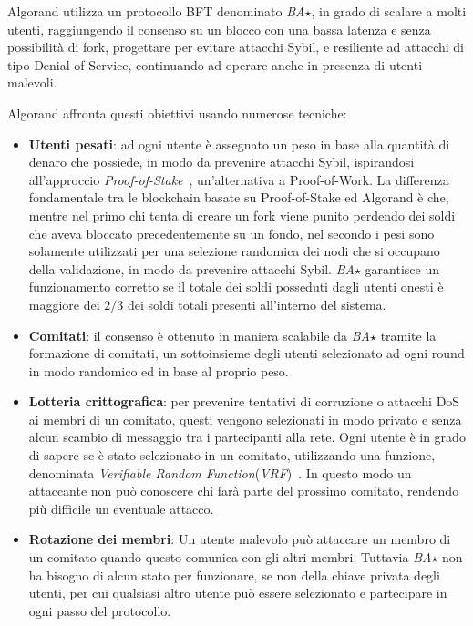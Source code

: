 Algorand utilizza un protocollo BFT denominato \emph{BA$\star$}, in grado di scalare a molti utenti, raggiungendo il consenso su un blocco con una bassa latenza e senza possibilità di fork, progettare per evitare attacchi Sybil, e resiliente ad attacchi di tipo Denial-of-Service, continuando ad operare anche in presenza di utenti malevoli.

Algorand affronta questi obiettivi usando numerose tecniche:
\begin{itemize}
	\item \textbf{Utenti pesati}: ad ogni utente è assegnato un peso in base alla quantità di denaro che possiede, in modo da prevenire attacchi Sybil, ispirandosi all'approccio \textit{Proof-of-Stake}~\cite{kiayias2017ouroboros}, un'alternativa a Proof-of-Work. La differenza fondamentale tra le blockchain basate su Proof-of-Stake ed Algorand è che, mentre nel primo chi tenta di creare un fork viene punito perdendo dei soldi che aveva bloccato precedentemente su un fondo, nel secondo i pesi sono solamente utilizzati per una selezione randomica dei nodi che si occupano della validazione, in modo da prevenire attacchi Sybil. \emph{BA$\star$} garantisce un funzionamento corretto se il totale dei soldi posseduti dagli utenti onesti è maggiore dei $2/3$ dei soldi totali presenti all'interno del sistema.
	\item \textbf{Comitati}: il consenso è ottenuto in maniera scalabile da \emph{BA$\star$} tramite la formazione di comitati, un sottoinsieme degli utenti selezionato ad ogni round in modo randomico ed in base al proprio peso.
	\item \textbf{Lotteria crittografica}: per prevenire tentativi di corruzione o attacchi DoS ai membri di un comitato, questi vengono selezionati in modo privato e senza alcun scambio di messaggio tra i partecipanti alla rete. Ogni utente è in grado di sapere se è stato selezionato in un comitato, utilizzando una funzione, denominata \textit{Verifiable Random Function}(\textit{VRF})~\cite{micali1999verifiable}. In questo modo un attaccante non può conoscere chi farà parte del prossimo comitato, rendendo più difficile un eventuale attacco.
	\item \textbf{Rotazione dei membri}: Un utente malevolo può attaccare un membro di un comitato quando questo comunica con gli altri membri. Tuttavia \emph{BA$\star$} non ha bisogno di alcun stato per funzionare, se non della chiave privata degli utenti, per cui qualsiasi altro utente può essere selezionato e partecipare in ogni passo del protocollo.
\end{itemize}

